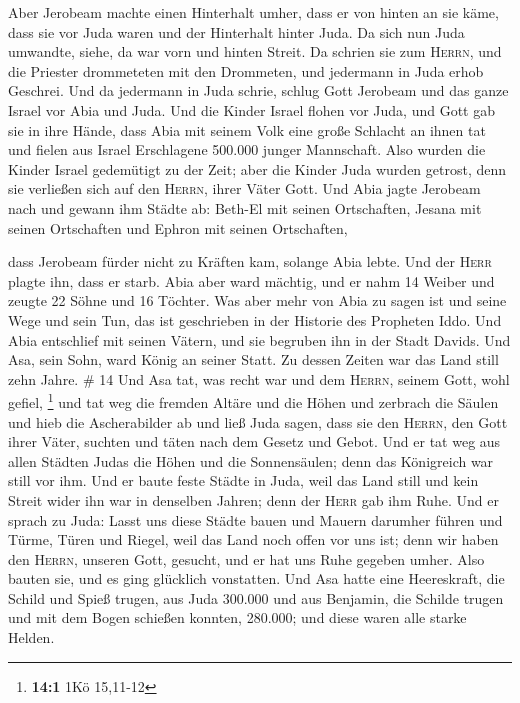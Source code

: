  Aber Jerobeam machte einen Hinterhalt umher, dass er von
hinten an sie käme, dass sie vor Juda waren und der Hinterhalt hinter
Juda.  Da sich nun Juda umwandte, siehe, da war vorn und
hinten Streit. Da schrien sie zum \textsc{Herrn}, und die Priester
drommeteten mit den Drommeten,  und jedermann in Juda
erhob Geschrei. Und da jedermann in Juda schrie, schlug Gott Jerobeam
und das ganze Israel vor Abia und Juda.  Und die Kinder
Israel flohen vor Juda, und Gott gab sie in ihre Hände, 
dass Abia mit seinem Volk eine große Schlacht an ihnen tat und fielen
aus Israel Erschlagene 500.000 junger Mannschaft.  Also
wurden die Kinder Israel gedemütigt zu der Zeit; aber die Kinder Juda
wurden getrost, denn sie verließen sich auf den \textsc{Herrn}, ihrer
Väter Gott.  Und Abia jagte Jerobeam nach und gewann ihm
Städte ab: Beth-El mit seinen Ortschaften, Jesana mit seinen Ortschaften
und Ephron mit seinen Ortschaften,

 dass Jerobeam fürder nicht zu Kräften kam, solange Abia
lebte. Und der \textsc{Herr} plagte ihn, dass er starb. 
Abia aber ward mächtig, und er nahm 14 Weiber und zeugte 22 Söhne und 16
Töchter.  Was aber mehr von Abia zu sagen ist und seine
Wege und sein Tun, das ist geschrieben in der Historie des Propheten
Iddo.  Und Abia entschlief mit seinen Vätern, und sie
begruben ihn in der Stadt Davids. Und Asa, sein Sohn, ward König an
seiner Statt. Zu dessen Zeiten war das Land still zehn Jahre. \# 14
 Und Asa tat, was recht war und dem \textsc{Herrn}, seinem
Gott, wohl gefiel, \footnote{\textbf{14:1} 1Kö 15,11-12} 
und tat weg die fremden Altäre und die Höhen und zerbrach die Säulen und
hieb die Ascherabilder ab  und ließ Juda sagen, dass sie
den \textsc{Herrn}, den Gott ihrer Väter, suchten und täten nach dem
Gesetz und Gebot.  Und er tat weg aus allen Städten Judas
die Höhen und die Sonnensäulen; denn das Königreich war still vor ihm.
 Und er baute feste Städte in Juda, weil das Land still
und kein Streit wider ihn war in denselben Jahren; denn der
\textsc{Herr} gab ihm Ruhe.  Und er sprach zu Juda: Lasst
uns diese Städte bauen und Mauern darumher führen und Türme, Türen und
Riegel, weil das Land noch offen vor uns ist; denn wir haben den
\textsc{Herrn}, unseren Gott, gesucht, und er hat uns Ruhe gegeben
umher. Also bauten sie, und es ging glücklich vonstatten. 
Und Asa hatte eine Heereskraft, die Schild und Spieß trugen, aus Juda
300.000 und aus Benjamin, die Schilde trugen und mit dem Bogen schießen
konnten, 280.000; und diese waren alle starke Helden.

